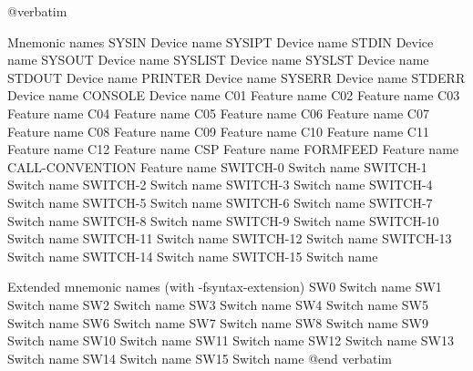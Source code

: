 @verbatim

Mnemonic names
SYSIN		Device name
SYSIPT		Device name
STDIN		Device name
SYSOUT		Device name
SYSLIST		Device name
SYSLST		Device name
STDOUT		Device name
PRINTER		Device name
SYSERR		Device name
STDERR		Device name
CONSOLE		Device name
C01		Feature name
C02		Feature name
C03		Feature name
C04		Feature name
C05		Feature name
C06		Feature name
C07		Feature name
C08		Feature name
C09		Feature name
C10		Feature name
C11		Feature name
C12		Feature name
CSP		Feature name
FORMFEED	Feature name
CALL-CONVENTION	Feature name
SWITCH-0	Switch name
SWITCH-1	Switch name
SWITCH-2	Switch name
SWITCH-3	Switch name
SWITCH-4	Switch name
SWITCH-5	Switch name
SWITCH-6	Switch name
SWITCH-7	Switch name
SWITCH-8	Switch name
SWITCH-9	Switch name
SWITCH-10	Switch name
SWITCH-11	Switch name
SWITCH-12	Switch name
SWITCH-13	Switch name
SWITCH-14	Switch name
SWITCH-15	Switch name

Extended mnemonic names (with -fsyntax-extension)
SW0		Switch name
SW1		Switch name
SW2		Switch name
SW3		Switch name
SW4		Switch name
SW5		Switch name
SW6		Switch name
SW7		Switch name
SW8		Switch name
SW9		Switch name
SW10		Switch name
SW11		Switch name
SW12		Switch name
SW13		Switch name
SW14		Switch name
SW15		Switch name
@end verbatim

